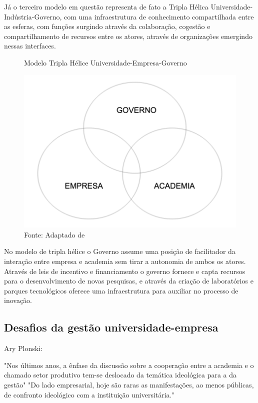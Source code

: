Já o terceiro modelo em questão representa de fato a Tripla Hélica Universidade-Indústria-Governo, com uma infraestrutura de conhecimento compartilhada entre as esferas, com funções surgindo através da colaboração, cogestão e compartilhamento de recursos entre os atores, através de organizações emergindo nessas interfaces.


\begin{figure}[H]
\caption{Modelo Tripla Hélice Universidade-Empresa-Governo}
\centerline{\includegraphics[scale=0.5]{img/triplehelix3}}
\label{fig:triplehelix3}
\caption* {Fonte: Adaptado de }
\end{figure}

No modelo de tripla hélice o Governo assume uma posição de facilitador da interação entre empresa e academia sem tirar a autonomia de ambos os atores. Através de leis de incentivo e financiamento o governo fornece e capta recursos para o desenvolvimento de novas pesquisas, e através da criação de laboratórios e parques tecnológicos oferece uma infraestrutura para  auxiliar no processo de inovação.

\subsection{Desafios da gestão universidade-empresa}
\label{cha:univ_empreend}

Ary Plonski:

"Nos últimos anos, a ênfase da discussão sobre a cooperação entre a academia e o chamado setor produtivo tem-se deslocado da temática ideológica para a da gestão"
"Do lado empresarial, hoje são raras as manifestações, ao menos públicas, de confronto ideológico com a instituição universitária."

